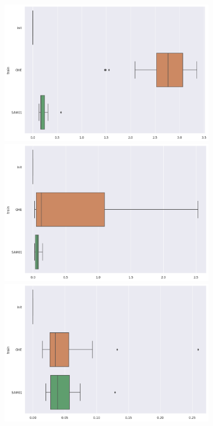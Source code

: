 \documentclass{article}
\theoremstyle{definition}
\begin{document}
\begin{figure}[ht]
     \centering
     \begin{subfigure}[b]{0.15\textwidth}
         \centering
         \includegraphics[width=\textwidth]{imgs/Illu/1000Epochs/Imb/Boxplots_Corr_Xhat.png}
         \quad
         \includegraphics[width=\textwidth]{imgs/Illu/2000Epochs/Imb/Boxplots_Corr_Xhat.png}
         \quad
         \includegraphics[width=\textwidth]{imgs/Illu/3000Epochs/Imb/Boxplots_Corr_Xhat.png}       

\end{subfigure}
\end{figure}
\end{document}
